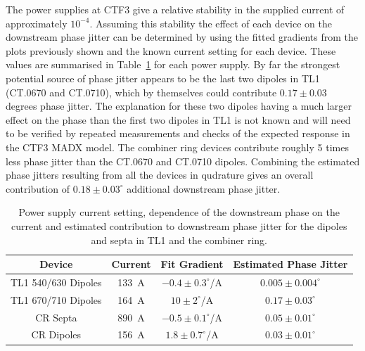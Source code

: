 The power supplies at CTF3 give a relative stability in the supplied current of approximately \(10^{-4}\). Assuming this stability the effect of each device on the downstream phase jitter can be determined by using the fitted gradients from the plots previously shown and the known current setting for each device. These values are summarised in Table~\ref{t:otherJitSources} for each power supply. By far the strongest potential source of phase jitter appears to be the last two dipoles in TL1 (CT.0670 and CT.0710), which by themselves could contribute \(0.17\pm0.03\) degrees phase jitter. 
The explanation for these two dipoles having a much larger effect on the phase than the first two dipoles in TL1 is not known and will need to be verified by repeated measurements and checks of the expected response in the CTF3 MADX model. The combiner ring devices contribute roughly 5 times less phase jitter than the CT.0670 and CT.0710 dipoles. 
Combining the estimated phase jitters resulting from all the devices in qudrature gives an overall contribution of \(0.18\pm0.03^\circ\) additional downstream phase jitter.

\begin{table}
  \begin{center}
    \begin{tabular}{| c c c c |}
	   \hline
       Device & Current & Fit Gradient & Estimated Phase Jitter \\ \hline
       TL1 540/630 Dipoles & 133~A & \(-0.4\pm0.3^\circ\)/A & \(0.005\pm0.004^\circ\)\\
       TL1 670/710 Dipoles & 164~A & \(10\pm2^\circ\)/A & \(0.17\pm0.03^\circ\)\\
       CR Septa & 890~A &  \(-0.5\pm0.1^\circ\)/A & \(0.05\pm0.01^\circ\)\\
       CR Dipoles & 156~A & \(1.8\pm0.7^\circ\)/A & \(0.03\pm0.01^\circ\)\\ \hline 
    \end{tabular}
    \caption{Power supply current setting, dependence of the downstream phase on the current and estimated contribution to downstream phase jitter for the dipoles and septa in TL1 and the combiner ring.}
  	\label{t:otherJitSources}
  \end{center}
\end{table}

